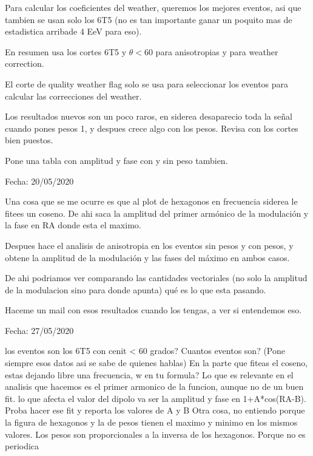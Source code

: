 \begin{itemize}
\done Para calcular los coeficientes del weather, queremos los mejores eventos, asi que tambien se usan solo los 6T5 (no es tan importante ganar un poquito mas de estadistica arribade 4 EeV para eso).

\done En resumen usa los cortes 6T5 y $\theta<60$ para anisotropias y para weather correction.

\done El corte de quality weather flag solo se usa para seleccionar los eventos para calcular las correcciones del weather.

\done Los resultados nuevos son un poco raros, en siderea desaparecio toda la señal cuando pones pesos 1, y despues crece algo con los pesos. Revisa con los cortes bien puestos.

\done Pone una tabla con amplitud y fase con y sin peso tambien.

\end{itemize}


Fecha: 20/05/2020

\begin{itemize}


\done Una cosa que se me ocurre es que al plot de hexagonos en frecuencia siderea le fitees un coseno. De ahi saca la amplitud del primer armónico de la modulación y la fase en RA donde esta el maximo.

\done Despues hace el analisis de anisotropia en los eventos sin pesos y con pesos, y obtene la amplitud de la modulación y las fases del máximo en ambos casos.

\done De ahi podriamos ver comparando las cantidades vectoriales (no solo la amplitud de la modulacion sino para donde apunta) qué es lo que esta pasando.

\done Haceme un mail con esos resultados cuando los tengas, a ver si entendemos eso.

\end{itemize}



Fecha: 27/05/2020

\begin{itemize}
	\done los eventos son los 6T5 con cenit < 60 grados? Cuantos eventos son? (Pone siempre esos datos asi se sabe de quienes hablas)
	\done En la parte que fiteas el coseno, estas dejando libre una frecuencia, w en tu formula? 
	\done Lo que es relevante en el analisis que hacemos es el primer armonico de la funcion, aunque no de un buen fit. lo que afecta el valor del dipolo va ser la amplitud y fase en 1+A*cos(RA-B). Proba hacer ese fit y reporta los valores de A y B
	\done Otra cosa, no entiendo porque la figura de hexagonos y la de pesos tienen el maximo y minimo en los mismos valores. Los pesos son proporcionales a la inversa de los hexagonos.
	\done Porque no es periodica
\end{itemize}



